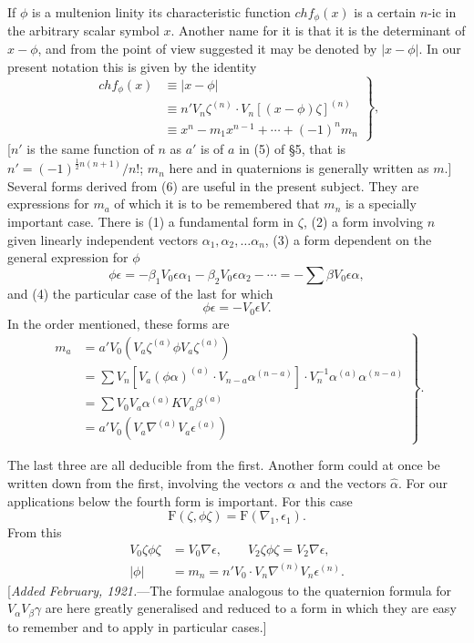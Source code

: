 \documentclass[11pt]{article}
\begin{document}
\indent If $\phi$ is a multenion linity its characteristic function $chf_\phi(x)$ is a certain $n$-ic in the arbitrary scalar symbol $x$. Another name for it is that it is the determinant of $x-\phi$, and from the point of view suggested it may be denoted by $|x-\phi|$. In our present notation this is given by the identity
\begin{equation}\left.\begin{aligned}chf_\phi(x)&\equiv|x-\phi|\\&\equiv n'V_n\zeta^{(n)}\cdot V_n[(x-\phi)\zeta]^{(n)}\\&\equiv x^n-m_1x^{n-1}+\cdots+(-1)^nm_n\end{aligned}\right\},\tag{6}\end{equation}
[$n'$ is the same function of $n$ as $a'$ is of $a$ in (5) of §5, that is $n'=(-1)^{\frac12n(n+1)}/n!$; $m_n$ here and in quaternions is generally written as $m$.] Several forms derived from (6) are useful in the present subject. They are expressions for $m_a$ of which it is to be remembered that $m_n$ is a specially important case. There is (1) a fundamental form in $\zeta$, (2) a form involving $n$ given linearly independent vectors $\alpha_1,\alpha_2,\ldots\alpha_n$, (3) a form dependent on the general expression for $\phi$
\begin{equation}\phi\epsilon=-\beta_1V_0\epsilon\alpha_1-\beta_2V_0\epsilon\alpha_2-\cdots=-\sum\beta V_0\epsilon\alpha,\tag{7}\end{equation}
and (4) the particular case of the last for which
\begin{equation}\phi\epsilon=-V_0\epsilon V.\tag{8}\end{equation}
In the order mentioned, these forms are
\begin{equation}\left.\begin{aligned}m_a&=a'V_0(V_a\zeta^{(a)}\phi V_a\zeta^{(a)})\\&=\sum V_n[V_a(\phi\alpha)^{(a)}\cdot V_{n-a}\alpha^{(n-a)}]\cdot V_n^{-1}\alpha^{(a)}\alpha^{(n-a)}\\&=\sum V_0V_a\alpha^{(a)}KV_a\beta^{(a)}\\&=a'V_0(V_a\nabla^{(a)}V_a\epsilon^{(a)})\end{aligned}\right\}.\tag{9}\end{equation}

The last three are all deducible from the first. Another form could at once be written down from the first, involving the vectors $\alpha$ and the vectors $\hat\alpha$. For our applications below the fourth form is important. For this case
\begin{equation}\mathrm F(\zeta,\phi\zeta)=\mathrm F(\nabla_1,\epsilon_1).\tag{10}\end{equation}
From this
\begin{align}V_0\zeta\phi\zeta&=V_0\nabla\epsilon,\qquad V_2\zeta\phi\zeta=V_2\nabla\epsilon,\tag{11}\\|\phi|&=m_n=n'V_0\cdot V_n\nabla^{(n)}V_n\epsilon^{(n)}.\tag{12}\end{align}
[\emph{Added February, 1921.}---The formulae analogous to the quaternion formula for $V_\alpha V_\beta\gamma$ are here greatly generalised and reduced to a form in which they are easy to remember and to apply in particular cases.]
\end{document}

